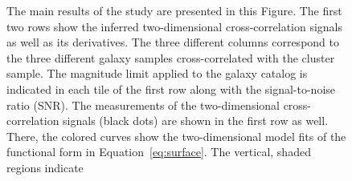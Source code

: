 \documentclass[iop, apjl, twocolappendix, numberedappendix]{emulateapj}
\begin{document}
\begin{figure}
\caption{The main results of the study are presented in this Figure.
The first two rows show the inferred two-dimensional cross-correlation
signals as well as its derivatives.
The three different columns correspond to the three different galaxy
samples cross-correlated with the cluster sample.
The magnitude limit applied to the galaxy catalog is indicated in
each tile of the first row along with the signal-to-noise ratio (SNR).
The measurements of the two-dimensional cross-correlation
signals (black dots) are shown in the first row as well. There, the colored
curves show the two-dimensional model fits of the functional
form in Equation~\ref{eq:surface}. The vertical, shaded regions indicate
}
\end{figure}
\end{document}
